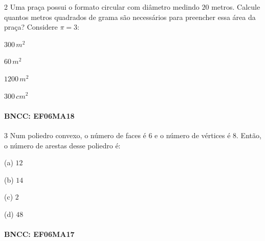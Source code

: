 \num{2}  Uma praça possui o formato circular com diâmetro medindo $20$ metros.
Calcule quantos metros quadrados de grama são necessários para preencher
essa área da praça? Considere $π = 3$:

\begin{escolha}
\item $300\,m^2$
\item $60\,m^2$
\item $1200\,m^2$
\item $300\,cm^2$
\end{escolha}

\paragraph{BNCC: EF06MA18 }


\num{3}  Num poliedro convexo, o número de faces é $6$ e o número de vértices é
$8$. Então, o número de arestas desse poliedro é:

(a) $12$

(b) $14$

(c) $2$

(d) $48$

\paragraph{BNCC: EF06MA17 }

